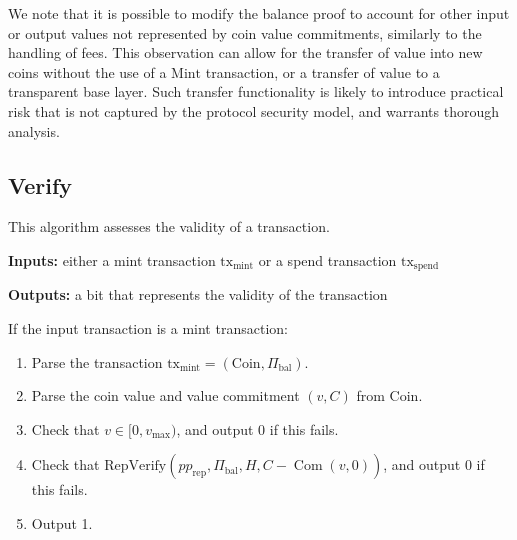 \documentclass{llncs}
\newcommand{\com}{\operatorname{Com}}
\begin{document}
\begin{remark}
We note that it is possible to modify the balance proof to account for other input or output values not represented by coin value commitments, similarly to the handling of fees.
This observation can allow for the transfer of value into new coins without the use of a $\text{Mint}$ transaction, or a transfer of value to a transparent base layer.
Such transfer functionality is likely to introduce practical risk that is not captured by the protocol security model, and warrants thorough analysis.
\end{remark}


\subsection{Verify}

This algorithm assesses the validity of a transaction.

\textbf{Inputs:} either a mint transaction $\text{tx}_{\text{mint}}$ or a spend transaction $\text{tx}_{\text{spend}}$

\textbf{Outputs:} a bit that represents the validity of the transaction

If the input transaction is a mint transaction:
\begin{enumerate}
    \item Parse the transaction $\text{tx}_{\text{mint}} = (\text{Coin}, \Pi_{\text{bal}})$.
    \item Parse the coin value and value commitment $(v, C)$ from $\text{Coin}$.
    \item Check that $v \in [0,v_{\text{max}})$, and output 0 if this fails.
    \item Check that $\text{RepVerify}(pp_{\text{rep}},\Pi_{\text{bal}},H,C - \com(v,0))$, and output 0 if this fails.
    \item Output 1.
\end{enumerate}
\end{document}
